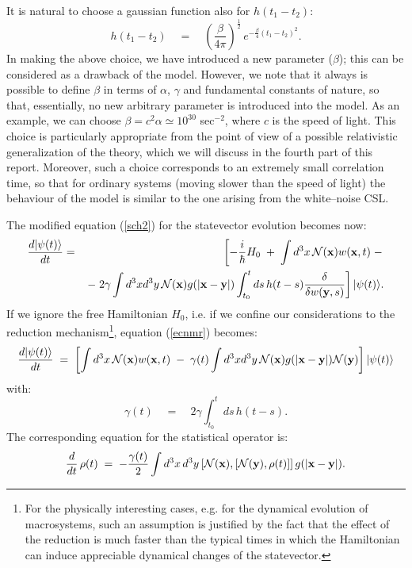 \documentclass[10pt,a4paper]{article}
\begin{document}
It is  natural to choose a gaussian function also for $h(t_{1} -
t_{2})$:
\begin{equation}
h(t_{1} - t_{2}) \quad = \quad
\left(\frac{\beta}{4\pi}\right)^{\frac{1}{2}}\, e^{\displaystyle -
\frac{\beta}{4} (t_{1} - t_{2})^{2}}.
\end{equation}
In making the above choice, we have introduced a new parameter
($\beta$); this can be considered as a drawback of the model.
However, we note that it always is possible to define $\beta$ in
terms of $\alpha$, $\gamma$ and fundamental constants of nature,
so that, essentially,  no new arbitrary parameter is introduced
into the model. As an example, we can choose $\beta = c^{2}\alpha
\simeq 10^{30}$ sec${}^{-2}$, where $c$ is the speed of light.
This choice is particularly appropriate from the point of view of
a possible relativistic generalization of the theory, which we
will discuss in the fourth part of this report. Moreover, such a
choice corresponds to an extremely small correlation time, so that
for ordinary systems (moving slower than the speed of light) the
behaviour of the model is similar to the one arising from the
white--noise CSL.

The modified equation (\ref{sch2}) for the statevector evolution
becomes now:
\begin{eqnarray} \label{ecnmr}
\frac{d |\psi(t)\rangle}{dt} & = & \left[ -\frac{i}{\hbar} H_{0}
\; + \; \int d^{3}x\, {\mathcal N}{(\bf x}) w({\bf x}, t) \; -
\right.
\\
& & \left. - \; 2\gamma \int d^{3}x d^{3}y\, {\mathcal N}({\bf x})
g(|{\bf x} - {\bf y}|) \int_{t_{0}}^{t} ds\, h(t - s)
\frac{\delta}{\delta w({\bf y}, s)} \right]|\psi(t)\rangle.
\nonumber
\end{eqnarray}
If we ignore the free Hamiltonian $H_{0}$, i.e. if we confine our
considerations to the reduction mechanism\footnote{For the
physically interesting cases, e.g. for the dynamical evolution of
macrosystems, such an assumption is justified by the fact that the
effect of the reduction is much faster than the typical times in
which the Hamiltonian can induce appreciable dynamical changes of
the statevector.}, equation (\ref{ecnmr}) becomes:
\begin{equation} \label{enmrsh}
\frac{d |\psi(t)\rangle}{dt} \; = \; \left[ \int d^{3}x\,
{\mathcal N}{(\bf x}) w({\bf x}, t) \; - \; \gamma(t) \int d^{3}x
d^{3}y\, {\mathcal N}({\bf x})g(|{\bf x} - {\bf y}|) {\mathcal
N}({\bf y}) \right] |\psi(t)\rangle
\end{equation}
with:
\begin{equation}
\gamma(t) \quad = \quad 2\gamma \int_{t_{0}}^{t} ds\, h(t - s).
\end{equation}
The corresponding equation for the statistical operator is:
\begin{equation} \label{eosnsh}
\frac{d}{dt}\, \rho(t) \; = \; -\frac{\gamma(t)}{2} \int d^{3}x\,
d^{3}y \left[ {\mathcal N}({\bf x}), \left[ {\mathcal N}({\bf y}),
\rho(t) \right] \right] g(|{\bf x} - {\bf y}|).
\end{equation}
\end{document}
